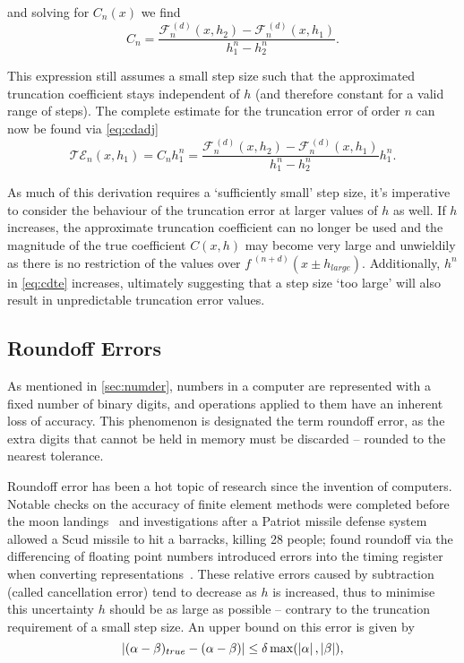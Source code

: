 and solving for $C_n(x)$ we find
\begin{equation}
 C_n = \frac{\mathcal{F}_n^{\,(d)}(x,h_2) - \mathcal{F}_n^{\,(d)}(x,h_1)}{h_1^n - h_2^n}.\label{eq:cdtrcoeff}
\end{equation}

This expression still assumes a small step size such that the approximated truncation coefficient stays independent of $h$ (and therefore constant for a valid range of steps).
The complete estimate for the truncation error of order $n$ can now be found via \cref{eq:cdadj}
\begin{equation}
\mathcal{TE}_n(x,h_1) = C_n h_1^n = \frac{\mathcal{F}_n^{\,(d)}(x,h_2) - \mathcal{F}_n^{\,(d)}(x,h_1)}{h_1^n - h_2^n}h_1^n.\label{eq:cdte}
\end{equation}

As much of this derivation requires a `sufficiently small' step size, it's imperative to consider the behaviour of the truncation error at larger values of $h$ as well.
If $h$ increases, the approximate truncation coefficient can no longer be used and
the magnitude of the true coefficient $C(x,h)$ may become very large and unwieldily as there is no restriction of the values over $f^{\;(n+d)}(x\pm h_{large})$.
Additionally, $h^n$ in \cref{eq:cdte} increases, ultimately suggesting that a step size `too large' will also result in unpredictable truncation error values.

\subsection{Roundoff Errors}\label{subsec:roundoff}

As mentioned in \cref{sec:numder}, numbers in a computer are represented with a fixed number of binary digits, and operations applied to them have an inherent loss of accuracy.
This phenomenon is designated the term roundoff error, as the extra digits that cannot be held in memory must be discarded -- rounded to the nearest tolerance.

Roundoff error has been a hot topic of research since the invention of computers.
Notable checks on the accuracy of finite element methods were completed before the moon landings~\cite{Cyrus1968} and investigations after a Patriot missile defense system allowed a Scud missile to hit a barracks, killing 28 people; found roundoff via the differencing of floating point numbers introduced errors into the timing register when converting representations~\cite{Skeel1992}.
These relative errors caused by subtraction (called cancellation error) tend to decrease as $h$ is increased, thus to minimise this uncertainty $h$ should be as large as possible -- contrary to the truncation requirement of a small step size.
An upper bound on this error is given by
\begin{equation}
 \left\lvert (\alpha-\beta)_{true} - (\alpha-\beta)\right\rvert \leq \delta \max(\left\lvert \alpha\right\rvert,\left\lvert \beta\right\rvert),
\end{equation}

